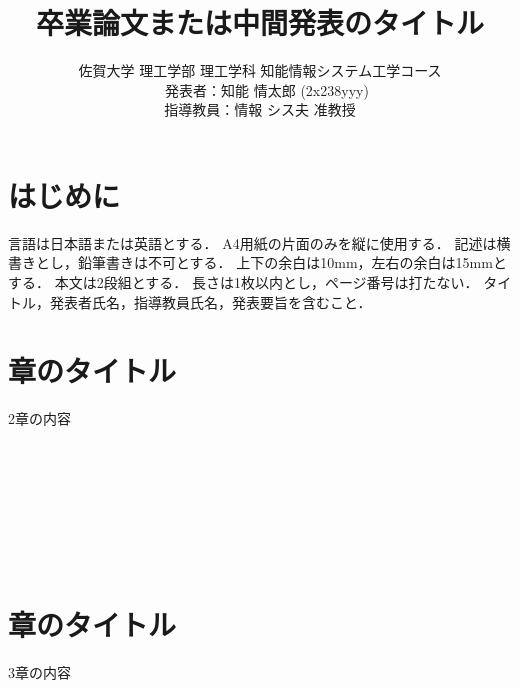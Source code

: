 ﻿\documentclass[twocolumn,a4j]{jarticle}
\title{
  卒業論文または中間発表のタイトル
}
\author{
  佐賀大学 理工学部 理工学科 知能情報システム工学コース\\
  　発表者：知能 情太郎 (2x238yyy)\\
  指導教員：情報 シス夫 准教授
}
\begin{document}
\date{\empty}
\maketitle
\thispagestyle{empty}

\section{はじめに }

言語は日本語または英語とする．
A4用紙の片面のみを縦に使用する．
記述は横書きとし，鉛筆書きは不可とする．
上下の余白は10mm，左右の余白は15mmとする．
本文は2段組とする．
長さは1枚以内とし，ページ番号は打たない．
タイトル，発表者氏名，指導教員氏名，発表要旨を含むこと．



\section{章のタイトル}
2章の内容
\\
\\
\\
\\
\\
\\
\\
\\


\section{章のタイトル}
3章の内容
\\
\\
\\
\\
\\
\\
\\
\\
\end{document}
